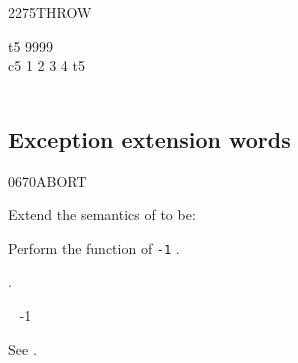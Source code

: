 \begin{worddef}{2275}{THROW}
\begin{testing}
		\word{:} t5   9999  \word{;} \\
		\word{:} c5 1 2 3 4 \word{[']} t5  \tab[4.5]   \\
		\tab {}      \word{;} \tab {}  \\
	\end{testing}
\end{worddef}

\newpage
\subsection{Exception extension words} %
\extended

\begin{worddef}{0670}{ABORT}
\item Extend the semantics of  to be:


	Perform the function of \texttt{-1} .

\see {}.

	\begin{implement} %
		\word{:}  ~ -1  ~ \word{;}
	\end{implement}

	\begin{testing}
		See .
	\end{testing}
\end{worddef}


